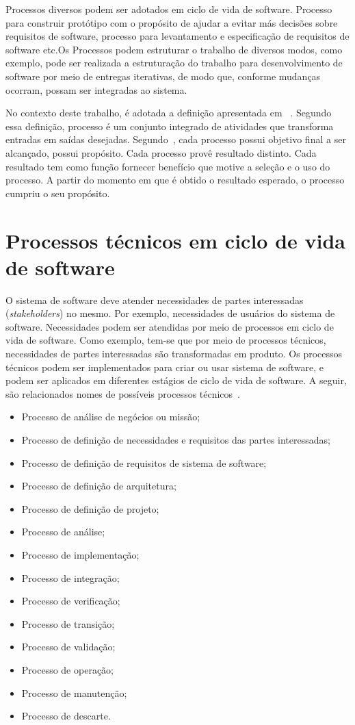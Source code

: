 Processos diversos podem ser adotados em ciclo de vida de software. Processo para construir protótipo com o propósito de ajudar a evitar más decisões sobre requisitos de software, processo para levantamento e especificação de requisitos de software etc.Os Processos podem estruturar o trabalho de diversos modos, como exemplo, pode ser realizada a estruturação do trabalho para desenvolvimento de software por meio de entregas iterativas, de modo que, conforme mudanças ocorram, possam ser integradas ao sistema.

No contexto deste trabalho, é adotada a definição apresentada em ~\cite{ISO_247483}. Segundo essa definição, processo é um conjunto integrado de atividades que transforma entradas em saídas desejadas. Segundo~\cite{ISO_247483}, cada processo possui objetivo final a ser alcançado, possui propósito. Cada processo provê resultado distinto. Cada resultado tem como função fornecer benefício que motive a seleção e o uso do processo. A partir do momento em que é obtido o resultado esperado, o processo cumpriu o seu propósito.

\section{Processos técnicos em ciclo de vida de software}

O sistema de software deve atender necessidades de partes interessadas (\emph{stakeholders}) no mesmo. Por exemplo, necessidades de usuários do sistema de software. Necessidades podem ser atendidas por meio de processos em ciclo de vida de software. Como exemplo, tem-se que por meio de processos técnicos, necessidades de partes interessadas são transformadas em produto. Os processos técnicos podem ser implementados para criar ou usar sistema de software, e podem ser aplicados em diferentes estágios de ciclo de vida de software. A seguir, são relacionados nomes de possíveis processos técnicos~\cite{ISO_12207}.

\begin{itemize}
    \item Processo de análise de negócios ou missão;
    \item Processo de definição de necessidades e requisitos das partes interessadas;
    \item Processo de definição de requisitos de sistema de software;
    \item Processo de definição de arquitetura;
    \item Processo de definição de projeto;
    \item Processo de análise;
    \item Processo de implementação;
    \item Processo de integração;
    \item Processo de verificação;
    \item Processo de transição;
    \item Processo de validação;
    \item Processo de operação;
    \item Processo de manutenção;
    \item Processo de descarte. 
\end{itemize}
      
